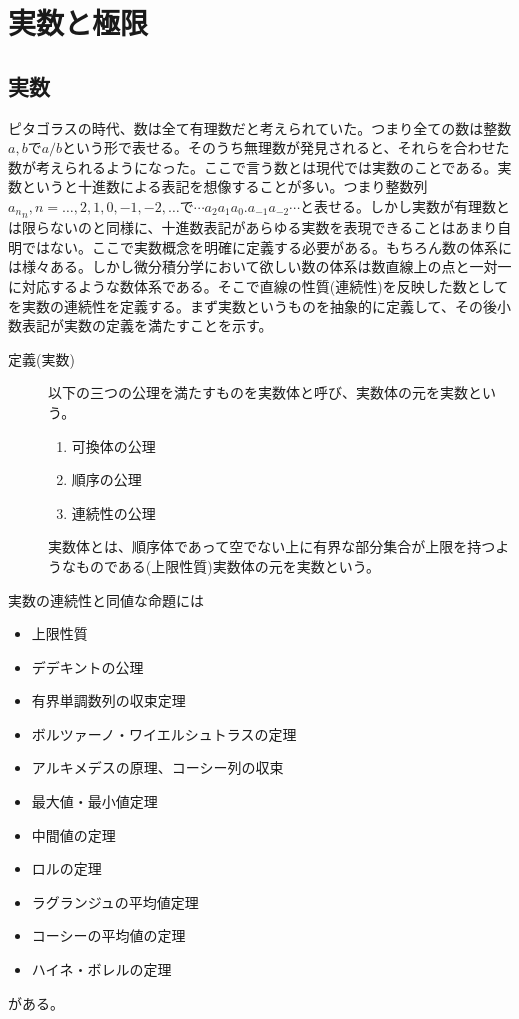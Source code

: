 \section{実数と極限}

\subsection{実数}
ピタゴラスの時代、数は全て有理数だと考えられていた。つまり全ての数は整数$a, b$で$a/b$という形で表せる。そのうち無理数が発見されると、それらを合わせた数が考えられるようになった。ここで言う数とは現代では実数のことである。実数というと十進数による表記を想像することが多い。つまり整数列${a_n}_n, n = \ldots, 2, 1, 0, -1, -2,\ldots$で$\cdots a_2a_1a_0.a_{-1}a_{-2}\cdots$と表せる。しかし実数が有理数とは限らないのと同様に、十進数表記があらゆる実数を表現できることはあまり自明ではない。ここで実数概念を明確に定義する必要がある。もちろん数の体系には様々ある。しかし微分積分学において欲しい数の体系は数直線上の点と一対一に対応するような数体系である。そこで直線の性質(連続性)を反映した数としてを実数の連続性を定義する。まず実数というものを抽象的に定義して、その後小数表記が実数の定義を満たすことを示す。
\begin{description}\item[定義(実数)]
	以下の三つの公理を満たすものを実数体と呼び、実数体の元を実数という。
	\begin{enumerate}
		\item 可換体の公理
		\item 順序の公理
		\item 連続性の公理
	\end{enumerate}
	実数体とは、順序体であって空でない上に有界な部分集合が上限を持つようなものである(上限性質)実数体の元を実数という。
\end{description}
実数の連続性と同値な命題には
\begin{itemize}
	\item 上限性質
	\item デデキントの公理
	\item 有界単調数列の収束定理
	\item ボルツァーノ・ワイエルシュトラスの定理
	\item アルキメデスの原理、コーシー列の収束
	\item 最大値・最小値定理
	\item 中間値の定理
	\item ロルの定理
	\item ラグランジュの平均値定理
	\item コーシーの平均値の定理
	\item ハイネ・ボレルの定理
\end{itemize}
がある。

